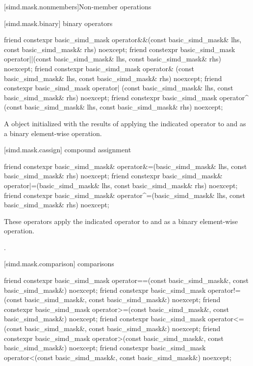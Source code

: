 [simd.mask.nonmembers]{Non-member operations}

[simd.mask.binary]{ binary operators}

\begin{itemdecl}
friend constexpr basic_simd_mask
  operator&&(const basic_simd_mask& lhs, const basic_simd_mask& rhs) noexcept;
friend constexpr basic_simd_mask
  operator||(const basic_simd_mask& lhs, const basic_simd_mask& rhs) noexcept;
friend constexpr basic_simd_mask
  operator& (const basic_simd_mask& lhs, const basic_simd_mask& rhs) noexcept;
friend constexpr basic_simd_mask
  operator| (const basic_simd_mask& lhs, const basic_simd_mask& rhs) noexcept;
friend constexpr basic_simd_mask
  operator^ (const basic_simd_mask& lhs, const basic_simd_mask& rhs) noexcept;
\end{itemdecl}

\begin{itemdescr}
  \pnum\returns
  A  object initialized with the results of applying the indicated operator
  to  and  as a binary element-wise operation.
\end{itemdescr}

[simd.mask.cassign]{ compound assignment}

\begin{itemdecl}
friend constexpr basic_simd_mask&
  operator&=(basic_simd_mask& lhs, const basic_simd_mask& rhs) noexcept;
friend constexpr basic_simd_mask&
  operator|=(basic_simd_mask& lhs, const basic_simd_mask& rhs) noexcept;
friend constexpr basic_simd_mask&
  operator^=(basic_simd_mask& lhs, const basic_simd_mask& rhs) noexcept;
\end{itemdecl}

\begin{itemdescr}
  \pnum\effects
  These operators apply the indicated operator to  and  as a binary
  element-wise operation.

  \pnum\returns
  .
\end{itemdescr}

[simd.mask.comparison]{ comparisons}

\begin{itemdecl}
friend constexpr basic_simd_mask
  operator==(const basic_simd_mask&, const basic_simd_mask&) noexcept;
friend constexpr basic_simd_mask
  operator!=(const basic_simd_mask&, const basic_simd_mask&) noexcept;
friend constexpr basic_simd_mask
  operator>=(const basic_simd_mask&, const basic_simd_mask&) noexcept;
friend constexpr basic_simd_mask
  operator<=(const basic_simd_mask&, const basic_simd_mask&) noexcept;
friend constexpr basic_simd_mask
  operator>(const basic_simd_mask&, const basic_simd_mask&) noexcept;
friend constexpr basic_simd_mask
  operator<(const basic_simd_mask&, const basic_simd_mask&) noexcept;
\end{itemdecl}

